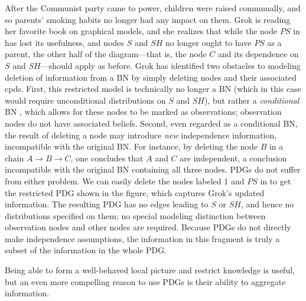 \documentclass[letterpaper]{article} %
\theoremstyle{plain}
\theoremstyle{definition}
\theoremstyle{remark}
\begin{document}
\begin{example}[restriction]\label{ex:grok-ablate}
  After the Communist party came to power,
  children were raised communally, and so parents' smoking habits no longer had any impact on them. Grok is reading her favorite book on graphical models, and she realizes that while the node $\mathit{PS}$ in  has lost its usefulness, and nodes $S$ and $\mathit{SH}$ no longer ought to have $\mathit{PS}$ as a parent, the other half of the diagram---that is, the node $C$ and its dependence on $S$ and $\mathit{SH}$---should apply as before.
Grok has identified two obstacles to modeling deletion of information from a BN
by simply deleting nodes and their associated cpds. First, this restricted model
is technically no longer a BN (which in this case would require unconditional
distributions on $S$ and $\mathit{SH}$), but rather a \emph{conditional} BN
\cite{KF09}, which allows for these nodes to be marked as observations;
observation nodes do not have associated beliefs. Second, even regarded as a
conditional BN, the result of deleting a node may introduce \emph{new}
independence information, incompatible with the original BN. For instance, by
deleting the node $B$ in a chain $A \rightarrow B \rightarrow C$, one concludes
that $A$ and $C$ are independent, a conclusion incompatible with the original BN
containing all three nodes.   
PDGs do not suffer from either problem.  We can easily delete the
nodes labeled 1 and $PS$ in  to get the
restricted PDG shown in the figure, which captures Grok's updated information.
The resulting PDG has no edges leading to $S$ or $\mathit{SH}$, and hence no
distributions specified on them; no special modeling distinction between
observation nodes and other nodes are required. Because PDGs do not directly
make independence assumptions, the information in this fragment is truly a
subset of the information in the whole PDG. 	
\end{example}

Being able to form a well-behaved local picture and restrict knowledge is
useful, but an even more compelling reason to use PDGs is their ability to
aggregate information. 
	
\end{document}
